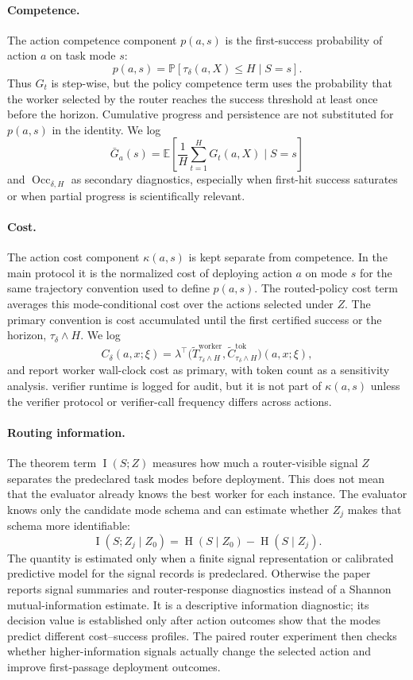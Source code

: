 \documentclass{article}
\DeclareMathOperator{\MI}{I}
\DeclareMathOperator{\Hent}{H}
\DeclareMathOperator{\Occ}{Occ}
\newcommand{\E}{\mathbb{E}}
\newcommand{\Prb}{\mathbb{P}}
\begin{document}
\paragraph{Competence.}
The action competence component $p(a,s)$ is the first-success probability of action $a$ on task mode $s$:
\[
p(a,s)=\Prb[\tau_\delta(a,X)\le H\mid S=s].
\]
Thus $G_t$ is step-wise, but the policy competence term uses the probability that the worker selected by the router reaches the success threshold at least once before the horizon.
Cumulative progress and persistence are not substituted for $p(a,s)$ in the identity.
We log
\[
\bar G_a(s)=\E\!\left[\frac{1}{H}\sum_{t=1}^H G_t(a,X)\mid S=s\right]
\]
and $\Occ_{\delta,H}$ as secondary diagnostics, especially when first-hit success saturates or when partial progress is scientifically relevant.

\paragraph{Cost.}
The action cost component $\kappa(a,s)$ is kept separate from competence.
In the main protocol it is the normalized cost of deploying action $a$ on mode $s$ for the same trajectory convention used to define $p(a,s)$.
The routed-policy cost term averages this mode-conditional cost over the actions selected under $Z$.
The primary convention is cost accumulated until the first certified success or the horizon, $\tau_\delta\wedge H$.
We log
\[
C_\delta(a,x;\xi)
=
\lambda^\top
\bigl(
\widetilde T^{\mathrm{worker}}_{\tau_\delta\wedge H},
\widetilde C^{\mathrm{tok}}_{\tau_\delta\wedge H}
\bigr)(a,x;\xi),
\]
and report worker wall-clock cost as primary, with token count as a sensitivity analysis.
verifier runtime is logged for audit, but it is not part of $\kappa(a,s)$ unless the verifier protocol or verifier-call frequency differs across actions.

\paragraph{Routing information.}
The theorem term $\MI(S;Z)$ measures how much a router-visible signal $Z$ separates the predeclared task modes before deployment.
This does not mean that the evaluator already knows the best worker for each instance.
The evaluator knows only the candidate mode schema and can estimate whether $Z_j$ makes that schema more identifiable:
\[
\MI(S;Z_j\mid Z_0)=\Hent(S\mid Z_0)-\Hent(S\mid Z_j).
\]
The quantity is estimated only when a finite signal representation or calibrated predictive model for the signal records is predeclared.
Otherwise the paper reports signal summaries and router-response diagnostics instead of a Shannon mutual-information estimate.
It is a descriptive information diagnostic; its decision value is established only after action outcomes show that the modes predict different cost--success profiles.
The paired router experiment then checks whether higher-information signals actually change the selected action and improve first-passage deployment outcomes.
\end{document}
